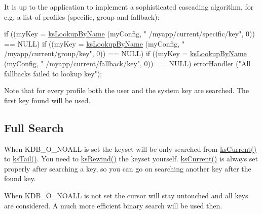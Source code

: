 It is up to the application to implement a sophisticated cascading algorithm, for e.\-g. a list of profiles (specific, group and fallback)\-: 
\begin{DoxyCode}
\textcolor{keywordflow}{if} ((myKey = \hyperlink{group__keyset_gad2e30fb6d4739d917c5abb2ac2f9c1a1}{ksLookupByName} (myConfig, \textcolor{stringliteral}{"
      /myapp/current/specific/key"}, 0)) == NULL)
        \textcolor{keywordflow}{if} ((myKey = \hyperlink{group__keyset_gad2e30fb6d4739d917c5abb2ac2f9c1a1}{ksLookupByName} (myConfig, \textcolor{stringliteral}{"
      /myapp/current/group/key"}, 0)) == NULL)
                \textcolor{keywordflow}{if} ((myKey = \hyperlink{group__keyset_gad2e30fb6d4739d917c5abb2ac2f9c1a1}{ksLookupByName} (myConfig, \textcolor{stringliteral}{"
      /myapp/current/fallback/key"}, 0)) == NULL)
                        errorHandler (\textcolor{stringliteral}{"All fallbacks failed to lookup key"});
\end{DoxyCode}


Note that for every profile both the user and the system key are searched. The first key found will be used.\hypertarget{group__keyset_fullsearch}{}\subsection{Full Search}\label{group__keyset_fullsearch}
When K\-D\-B\-\_\-\-O\-\_\-\-N\-O\-A\-L\-L is set the keyset will be only searched from \hyperlink{group__keyset_ga4287b9416912c5f2ab9c195cb74fb094}{ks\-Current()} to \hyperlink{group__keyset_gadca442c4ab43cf532b15091d7711559e}{ks\-Tail()}. You need to \hyperlink{group__keyset_gabe793ff51f1728e3429c84a8a9086b70}{ks\-Rewind()} the keyset yourself. \hyperlink{group__keyset_ga4287b9416912c5f2ab9c195cb74fb094}{ks\-Current()} is always set properly after searching a key, so you can go on searching another key after the found key.

When K\-D\-B\-\_\-\-O\-\_\-\-N\-O\-A\-L\-L is not set the cursor will stay untouched and all keys are considered. A much more efficient binary search will be used then.


